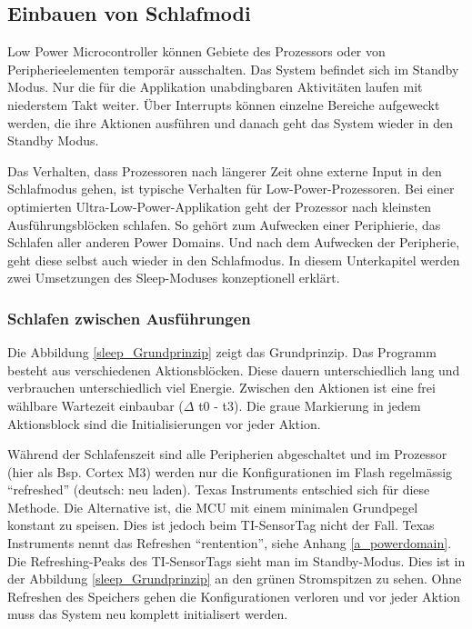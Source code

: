 \subsection{Einbauen von Schlafmodi}\label{pm_sleep} 

Low Power Microcontroller können Gebiete des Prozessors oder von Peripherieelementen temporär ausschalten. Das System befindet sich im Standby Modus. Nur die für die Applikation unabdingbaren Aktivitäten laufen mit niederstem Takt weiter. Über Interrupts können einzelne Bereiche aufgeweckt werden, die ihre Aktionen ausführen und danach geht das System wieder in den Standby Modus.

Das Verhalten, dass Prozessoren nach längerer Zeit ohne externe Input in den Schlafmodus gehen, ist typische Verhalten für Low-Power-Prozessoren. Bei einer optimierten Ultra-Low-Power-Applikation geht der Prozessor nach kleinsten Ausführungsblöcken schlafen. So gehört zum Aufwecken einer Periphierie, das Schlafen aller anderen Power Domains. Und nach dem Aufwecken der Peripherie, geht diese selbst auch wieder in den Schlafmodus. In diesem Unterkapitel werden zwei Umsetzungen des Sleep-Moduses konzeptionell erklärt.

\subsubsection{Schlafen zwischen Ausführungen}
\label{schlafen_theorie}

Die Abbildung \ref{sleep_Grundprinzip} zeigt das Grundprinzip. Das Programm besteht aus verschiedenen Aktionsblöcken. Diese dauern unterschiedlich lang und verbrauchen unterschiedlich viel Energie. Zwischen den Aktionen ist eine frei wählbare Wartezeit einbaubar ($\Delta$ t0 - t3). Die graue Markierung in jedem Aktionsblock sind die Initialisierungen vor jeder Aktion.

Während der Schlafenszeit sind alle Peripherien abgeschaltet und im Prozessor (hier als Bsp. Cortex M3) werden nur die Konfigurationen im Flash regelmässig ``refreshed'' (deutsch: neu laden). Texas Instruments entschied sich für diese Methode. Die Alternative ist, die MCU mit einem minimalen Grundpegel konstant zu speisen. Dies ist jedoch beim TI-SensorTag nicht der Fall. Texas Instruments nennt das Refreshen ``rentention'', siehe Anhang \ref{a_powerdomain}. Die Refreshing-Peaks des TI-SensorTags sieht man im Standby-Modus. Dies ist in der Abbildung \ref{sleep_Grundprinzip} an den grünen Stromspitzen zu sehen. Ohne Refreshen des Speichers gehen die Konfigurationen verloren und vor jeder Aktion muss das System neu komplett initialisert werden.

